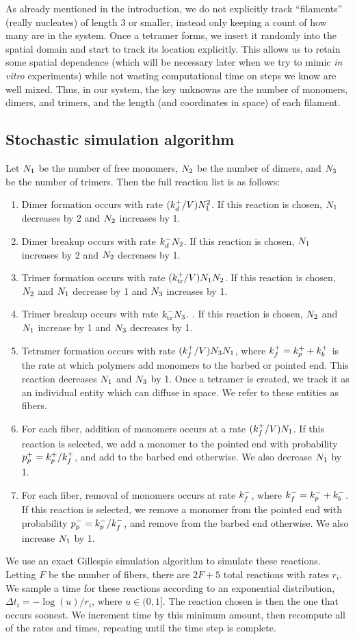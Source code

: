 \documentclass[11pt]{article}
\begin{document}
As already mentioned in the introduction, we do not explicitly track ``filaments'' (really nucleates) of length 3 or smaller, instead only keeping a count of how many are in the system. Once a tetramer forms, we insert it randomly into the spatial domain and start to track its location explicitly. This allows us to retain some spatial dependence (which will be necessary later when we try to mimic \emph{in vitro} experiments) while not wasting computational time on steps we know are well mixed. Thus, in our system, the key unknowns are the number of monomers, dimers, and trimers, and the length (and coordinates in space) of each filament. 

\subsection{Stochastic simulation algorithm \label{sec:SSA}}
Let $N_1$ be the number of free monomers, $N_2$ be the number of dimers, and $N_3$ be the number of trimers. Then the full reaction list is as follows:
\begin{enumerate}
\item Dimer formation occurs with rate $(k_d^+/V)N_1^2$. If this reaction is chosen, $N_1$ decreases by 2 and $N_2$ increases by 1. 
\item Dimer breakup occurs with rate $k_d^- N_2$. If this reaction is chosen, $N_1$ increases by 2 and $N_2$ decreases by 1. 
\item Trimer formation occurs with rate $(k_\text{tr}^+/V)N_1 N_2 $. If this reaction is chosen, $N_2$ and $N_1$ decrease by 1 and $N_3$ increases by 1. 
\item Trimer breakup occurs with rate $k_\text{tr}^- N_3$. . If this reaction is chosen, $N_2$ and $N_1$ increase by 1 and $N_3$ decreases by 1. 
\item Tetramer formation occurs with rate $(k_f^+/V) N_3 N_1$, where $k_f^+=k_p^++k_b^+$ is the rate at which polymers add monomers to the barbed or pointed end. This reaction decreases $N_1$ and $N_3$ by 1. Once a tetramer is created, we track it as an individual entity which can diffuse in space. We refer to these entities as fibers. 
\item For each fiber, addition of monomers occurs at a rate $(k_f^+/V) N_1$. If this reaction is selected, we add a monomer to the pointed end with probability $p_p^+= k_p^+/k_f^+$, and add to the barbed end otherwise. We also decrease $N_1$ by 1. 
\item For each fiber, removal of monomers occurs at rate $k_f^-$, where $k_f^-=k_p^-+k_b^-$.  If this reaction is selected, we remove a monomer from the pointed end with probability $p_p^-=k_p^-/k_f^-$, and remove from the barbed end otherwise. We also increase $N_1$ by 1. 
\end{enumerate}
We use an exact Gillespie simulation algorithm \cite{gillespie2007stochastic} to simulate these reactions. Letting $F$ be the number of fibers, there are $2F+5$ total reactions with rates $r_i$. We sample a time for these reactions according to an exponential distribution, $\Delta t_i=-\log(u)/r_i$, where $u \in (0,1]$. The reaction chosen is then the one that occurs soonest. We increment time by this minimum amount, then recompute all of the rates and times, repeating until the time step is complete.
\end{document}
